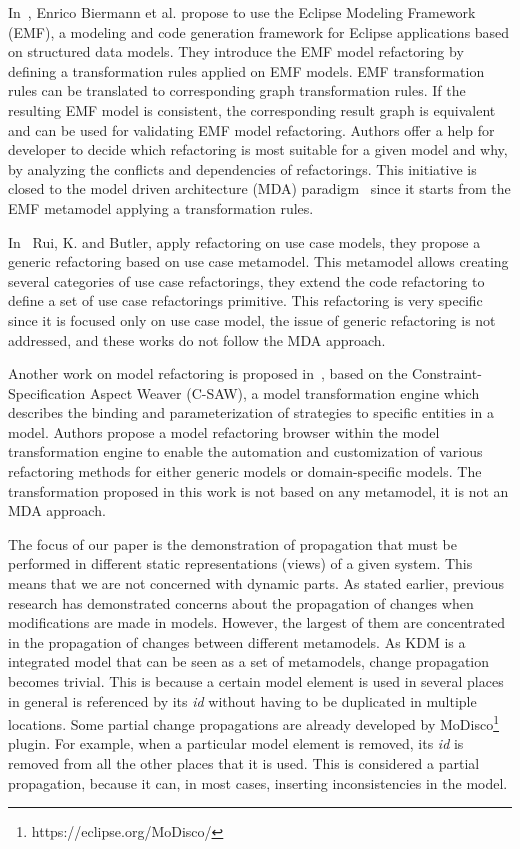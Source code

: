 



In~\cite{4440135}, Enrico Biermann et al. propose to use the Eclipse Modeling Framework (EMF), a modeling and code generation framework for Eclipse applications based on structured data models. They introduce the EMF model refactoring by defining a transformation rules applied on EMF models. EMF transformation rules can be translated to corresponding graph transformation rules. If the resulting EMF model is consistent, the corresponding result graph is equivalent and can be used for validating EMF model refactoring. Authors offer a help for developer to decide which refactoring is most suitable for a given model and why, by analyzing the conflicts and dependencies of refactorings. This initiative is closed to the model driven architecture (MDA) paradigm~\cite{Kleppe:2003} since it starts from the EMF metamodel applying a transformation rules.

In~\cite{Rui:2003} Rui, K. and Butler, apply refactoring on use case models, they propose a generic refactoring based on use case metamodel. This metamodel allows creating several categories of use case refactorings, they extend the code refactoring to define a set of use case refactorings primitive. This refactoring is very specific since it is focused only on use case model, the issue of generic refactoring is not addressed, and these works do not follow the MDA approach.

Another work on model refactoring is proposed in~\cite{Zhang05genericand}, based on the Constraint-Specification Aspect Weaver (C-SAW), a model transformation engine which describes the binding and parameterization of strategies to specific entities in a model. Authors propose a model refactoring browser within the model transformation engine to enable the automation and customization of various refactoring methods for either generic models or domain-specific models. The transformation proposed in this work is not based on any metamodel, it is not an MDA approach.

The focus of our paper is the demonstration of propagation that must be performed in different static representations (views) of a given system. This means that we are not concerned with dynamic parts.
As stated earlier, previous research has demonstrated concerns about the propagation of changes when modifications are made in models. However, the largest of them are concentrated in the propagation of changes between different metamodels. As KDM is a integrated model that can be seen as a set of metamodels, change propagation becomes trivial. This is because a certain model element is used in several places in general is referenced by its \textit{id} without having to be duplicated in multiple locations. Some partial change propagations are already developed by MoDisco\footnote{https://eclipse.org/MoDisco/} plugin. For example, when a particular model element is removed, its \textit{id} is removed from all the other places that it is used. This is considered a partial propagation, because it can, in most cases, inserting inconsistencies in the model.

